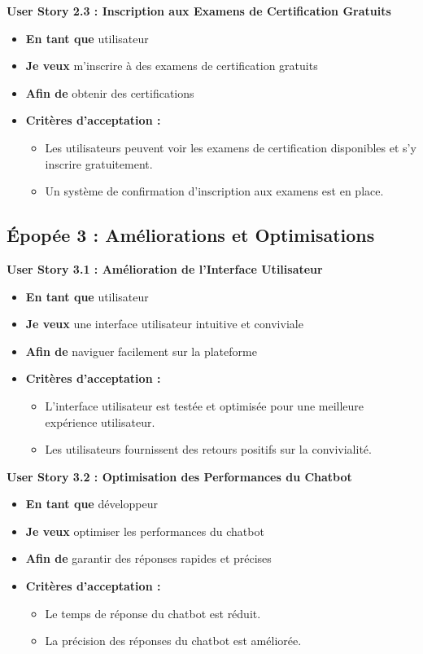 \documentclass[a4paper, 11pt, openany]{report}
\begin{document}
\textbf{User Story 2.3 : Inscription aux Examens de Certification Gratuits}
\begin{itemize}
    \item \textbf{En tant que} utilisateur
    \item \textbf{Je veux} m'inscrire à des examens de certification gratuits
    \item \textbf{Afin de} obtenir des certifications
    \item \textbf{Critères d'acceptation :}
    \begin{itemize}
        \item Les utilisateurs peuvent voir les examens de certification disponibles et s'y inscrire gratuitement.
        \item Un système de confirmation d'inscription aux examens est en place.
    \end{itemize}
\end{itemize}

\subsection{Épopée 3 : Améliorations et Optimisations}

\textbf{User Story 3.1 : Amélioration de l'Interface Utilisateur}
\begin{itemize}
    \item \textbf{En tant que} utilisateur
    \item \textbf{Je veux} une interface utilisateur intuitive et conviviale
    \item \textbf{Afin de} naviguer facilement sur la plateforme
    \item \textbf{Critères d'acceptation :}
    \begin{itemize}
        \item L'interface utilisateur est testée et optimisée pour une meilleure expérience utilisateur.
        \item Les utilisateurs fournissent des retours positifs sur la convivialité.
    \end{itemize}
\end{itemize}

\textbf{User Story 3.2 : Optimisation des Performances du Chatbot}
\begin{itemize}
    \item \textbf{En tant que} développeur
    \item \textbf{Je veux} optimiser les performances du chatbot
    \item \textbf{Afin de} garantir des réponses rapides et précises
    \item \textbf{Critères d'acceptation :}
    \begin{itemize}
        \item Le temps de réponse du chatbot est réduit.
        \item La précision des réponses du chatbot est améliorée.
    \end{itemize}
\end{itemize}
\end{document}
